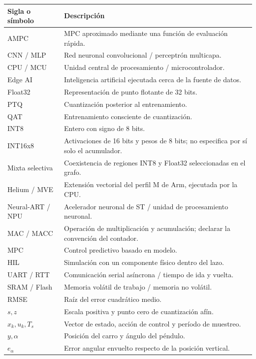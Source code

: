 \begingroup\small
\begin{longtable}{p{}p{}}
\toprule\textbf{Sigla o símbolo}&\textbf{Descripción}\\\midrule\endhead
AMPC & MPC aproximado mediante una función de evaluación rápida.\\
CNN / MLP & Red neuronal convolucional / perceptrón multicapa.\\
CPU / MCU & Unidad central de procesamiento / microcontrolador.\\
Edge AI & Inteligencia artificial ejecutada cerca de la fuente de datos.\\
Float32 & Representación de punto flotante de 32 bits.\\
PTQ & Cuantización posterior al entrenamiento.\\
QAT & Entrenamiento consciente de cuantización.\\
INT8 & Entero con signo de 8 bits.\\
INT16x8 & Activaciones de 16 bits y pesos de 8 bits; no especifica por sí solo el acumulador.\\
Mixta selectiva & Coexistencia de regiones INT8 y Float32 seleccionadas en el grafo.\\
Helium / MVE & Extensión vectorial del perfil M de Arm, ejecutada por la CPU.\\
Neural-ART / NPU & Acelerador neuronal de ST / unidad de procesamiento neuronal.\\
MAC / MACC & Operación de multiplicación y acumulación; declarar la convención del contador.\\
MPC & Control predictivo basado en modelo.\\
HIL & Simulación con un componente físico dentro del lazo.\\
UART / RTT & Comunicación serial asíncrona / tiempo de ida y vuelta.\\
SRAM / Flash & Memoria volátil de trabajo / memoria no volátil.\\
RMSE & Raíz del error cuadrático medio.\\
$s,z$ & Escala positiva y punto cero de cuantización afín.\\
$x_k,u_k,T_s$ & Vector de estado, acción de control y período de muestreo.\\
$y,\alpha$ & Posición del carro y ángulo del péndulo.\\
$e_\alpha$ & Error angular envuelto respecto de la posición vertical.\\
\bottomrule
\end{longtable}
\endgroup
